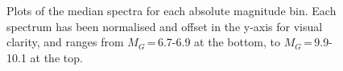 \begin{figure}
    \caption{Plots of the median spectra for each absolute magnitude bin. Each spectrum has been normalised and offset in the y-axis for visual clarity, and ranges from $M_G$\,=\,6.7-6.9 at the bottom, to $M_G$\,=\,9.9-10.1 at the top.}
\end{figure}
\begin{figure}
	\captionsetup{width=.8\textwidth}
	\hspace{-2cm}

\end{figure}
